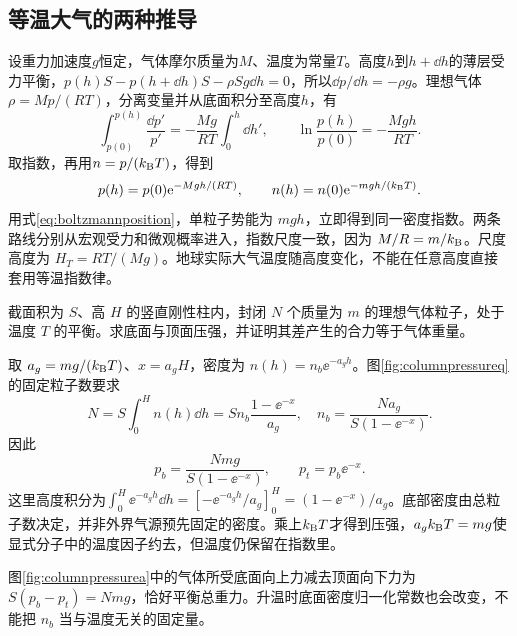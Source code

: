 
\subsection{等温大气的两种推导}
\label{th:barometric}
设重力加速度$g$恒定，气体摩尔质量为$M$、温度为常量$T$。高度$h$到$h+\dd h$的薄层受力平衡，$p(h)S-p(h+\dd h)S-\rho Sg\dd h=0$，所以$\dd p/\dd h=-\rho g$。理想气体$\rho=Mp/(RT)$，分离变量并从底面积分至高度$h$，有
\[
 \int_{p(0)}^{p(h)}\frac{\dd p'}{p'}
 =-\frac{Mg}{RT}\int_0^h\dd h',\qquad
 \ln\frac{p(h)}{p(0)}=-\frac{Mgh}{RT}.
\]
取指数，再用$n=p/(k_{\mathrm B} T)$，得到
\begin{equation}\label{eq:barometric}
 p(h)=p(0)\mathrm e^{-Mgh/(RT)},\qquad
 n(h)=n(0)\mathrm e^{-mgh/(k_{\mathrm B} T)}.
\end{equation}
用式\eqref{eq:boltzmannposition}，单粒子势能为 $mgh$，立即得到同一密度指数。两条路线分别从宏观受力和微观概率进入，指数尺度一致，因为 $M/R=m/k_{\mathrm B}$。尺度高度为 $H_T=RT/(Mg)$。地球实际大气温度随高度变化，不能在任意高度直接套用等温指数律。

\begin{example}[气柱压强与总重量]\label{ex:atmosphere}
截面积为 $S$、高 $H$ 的竖直刚性柱内，封闭 $N$ 个质量为 $m$ 的理想气体粒子，处于温度 $T$ 的平衡。求底面与顶面压强，并证明其差产生的合力等于气体重量。
\end{example}
\begin{solution}
取 $a_g=mg/(k_{\mathrm B} T)$、$x=a_gH$，密度为 $n(h)=n_b\ee^{-a_gh}$。图\ref{fig:columnpressureq}的固定粒子数要求
\[
 N=S\int_0^Hn(h)\dd h=Sn_b\frac{1-\ee^{-x}}{a_g},
 \quad n_b=\frac{Na_g}{S(1-\ee^{-x})}.
\]
因此
\[
 p_b=\frac{Nmg}{S(1-\ee^{-x})},\qquad
 p_t=p_b\ee^{-x}.
\]
这里高度积分为$\int_0^H\ee^{-a_gh}\dd h=[-\ee^{-a_gh}/a_g]_0^H=(1-\ee^{-x})/a_g$。底部密度由总粒子数决定，并非外界气源预先固定的密度。乘上$k_{\mathrm B} T$才得到压强，$a_gk_{\mathrm B} T=mg$使显式分子中的温度因子约去，但温度仍保留在指数里。

图\ref{fig:columnpressurea}中的气体所受底面向上力减去顶面向下力为 $S(p_b-p_t)=Nmg$，恰好平衡总重力。升温时底面密度归一化常数也会改变，不能把 $n_b$ 当与温度无关的固定量。
\end{solution}

